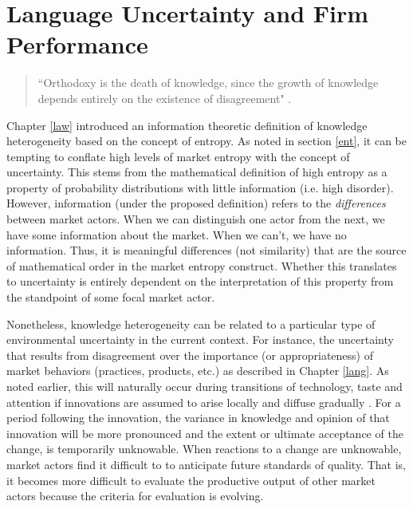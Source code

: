 \chapter{Language Uncertainty and Firm Performance \label{signal}}


\begin{small}
\begin{quote}
``Orthodoxy is the death of knowledge, since the growth of knowledge depends entirely on the existence of disagreement" \citep[p. 34]{popper1996}.
\end{quote}
\end{small}

Chapter \ref{law} introduced an information theoretic definition of knowledge heterogeneity based on the concept of entropy. As noted in section \ref{ent}, it can be tempting to conflate high levels of market entropy with the concept of uncertainty. This stems from the mathematical definition of high entropy as a property of probability distributions with little information (i.e. high disorder). However, information (under the proposed definition) refers to the \emph{differences} between market actors. When we can distinguish one actor from the next, we have some information about the market. When we can't, we have no information. Thus, it is meaningful differences (not similarity) that are the source of mathematical order in the market entropy construct. Whether this translates to uncertainty is entirely dependent on the interpretation of this property from the standpoint of some focal market actor.

Nonetheless, knowledge heterogeneity can be related to a particular type of environmental uncertainty in the current context. For instance, the uncertainty that results from disagreement over the importance (or appropriateness) of market behaviors (practices, products, etc.) as described in Chapter \ref{lang}. As noted earlier, this will naturally occur during transitions of technology, taste and attention if innovations are assumed to arise locally and diffuse gradually \citep{colyvas2007, rogers2002}. For a period following the innovation, the variance in knowledge and opinion of that innovation will be more pronounced and the extent or ultimate acceptance of the change, is temporarily unknowable. When reactions to a change are unknowable, market actors find it difficult to to anticipate future standards of quality. That is, it becomes more difficult to evaluate the productive output of other market actors because the criteria for evaluation is evolving.

